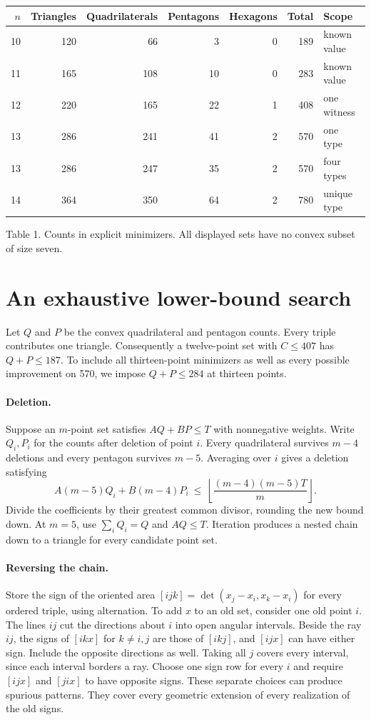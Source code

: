 \documentclass[11pt]{article}
\begin{document}
\begin{center}
\begin{tabular}{r r r r r r l}\toprule
$n$ & Triangles & Quadrilaterals & Pentagons & Hexagons & Total & Scope\\\midrule
10 & 120 & 66 & 3 & 0 & 189 & known value\\
11 & 165 & 108 & 10 & 0 & 283 & known value\\
12 & 220 & 165 & 22 & 1 & 408 & one witness\\
13 & 286 & 241 & 41 & 2 & 570 & one type\\
13 & 286 & 247 & 35 & 2 & 570 & four types\\
14 & 364 & 350 & 64 & 2 & 780 & unique type\\\bottomrule
\end{tabular}\par\smallskip
{\small Table 1. Counts in explicit minimizers. All displayed sets have no convex subset of size seven.}
\end{center}

\newpage
\section{An exhaustive lower-bound search}
Let $Q$ and $P$ be the convex quadrilateral and pentagon counts. Every triple contributes one triangle. Consequently a twelve-point set with $C\le407$ has $Q+P\le187$. To include all thirteen-point minimizers as well as every possible improvement on 570, we impose $Q+P\le284$ at thirteen points.

\paragraph{Deletion.} Suppose an $m$-point set satisfies $A Q+B P\le T$ with nonnegative weights. Write $Q_i,P_i$ for the counts after deletion of point $i$. Every quadrilateral survives $m-4$ deletions and every pentagon survives $m-5$. Averaging over $i$ gives a deletion satisfying
\[
 A(m-5)Q_i+B(m-4)P_i
 \ \le\ \left\lfloor \frac{(m-4)(m-5)T}{m}\right\rfloor.
\]
Divide the coefficients by their greatest common divisor, rounding the new bound down. At $m=5$, use $\sum_i Q_i=Q$ and $AQ\le T$. Iteration produces a nested chain down to a triangle for every candidate point set.

\paragraph{Reversing the chain.} Store the sign of the oriented area $[ijk]=\det(x_j-x_i,x_k-x_i)$ for every ordered triple, using alternation. To add $x$ to an old set, consider one old point $i$. The lines $ij$ cut the directions about $i$ into open angular intervals. Beside the ray $ij$, the signs of $[ikx]$ for $k\ne i,j$ are those of $[ikj]$, and $[ijx]$ can have either sign. Include the opposite directions as well. Taking all $j$ covers every interval, since each interval borders a ray. Choose one sign row for every $i$ and require $[ijx]$ and $[jix]$ to have opposite signs. These separate choices can produce spurious patterns. They cover every geometric extension of every realization of the old signs.
\end{document}
